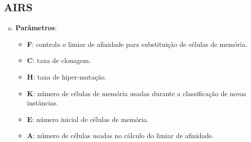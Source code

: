 \subsection{AIRS}

\begin{enumerate}[a)]
    \item \textbf{Parâmetros}:
        \begin{itemize}

        \item \textbf{F}: controla o limiar de afinidade para substituição de células de memória.

        \item \textbf{C}: taxa de clonagem.

        \item \textbf{H}: taxa de hiper-mutação.

        \item \textbf{K}: número de células de memória usadas durante a classificação de novas instâncias.

        \item \textbf{E}: número inicial de células de memória.

        \item \textbf{A}: número de células usadas no cálculo do limiar de afinidade.

\end{itemize}
\end{enumerate}
